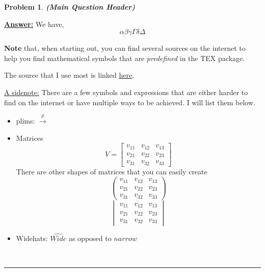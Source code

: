 \documentclass{article} %
\newtheorem{problem}[theorem]{Problem} %
\newenvironment{solution}[1][Answer]{\begin{singlespace}\underline{\textbf{#1:}}\quad }{\ \rule{0.3em}{0.3em}\end{singlespace}} %
\begin{document}
\begin{problem}
\normalfont
\textbf{(Main Question Header)}

\noindent \lipsum[1]
\end{problem}

\begin{solution}
We have, 
$$ \alpha  \beta  \gamma \Gamma \delta \Delta $$ %


\textbf{Note} that, when starting out, you can find several sources on the internet to help you find mathematical symbols that are \textit{predefined} in the TEX package.

The source that I use most is linked \hyperlink{https://oeis.org/wiki/List_of_LaTeX_mathematical_symbols}{here}.

\underline{A sidenote:} There are a few symbols and expressions that are either harder to find on the internet or have multiple ways to be achieved. I will list them below.

\begin{itemize}
    \item plims: $ \overset{p}{\longrightarrow} $
    
    \item Matrices
            $$V = \begin{bmatrix} 
    v_{11} & v_{12} &v_{13} \\v_{21} & v_{22} &v_{23} \\ v_{31} & v_{32} & v_{33}
    \end{bmatrix}$$
    There are other shapes of matrices that you can easily create
    $$ \begin{pmatrix} 
    v_{11} & v_{12} &v_{13} \\v_{21} & v_{22} &v_{23} \\ v_{31} & v_{32} & v_{33}
    \end{pmatrix} $$
    $$\begin{vmatrix} 
    v_{11} & v_{12} &v_{13} \\v_{21} & v_{22} &v_{23} \\ v_{31} & v_{32} & v_{33}
    \end{vmatrix}  $$
    
    \item Widehats: $\widehat{Wide}$ as opposed to $\hat{narrow}$
    

\end{itemize}
\end{solution}
\end{document}
